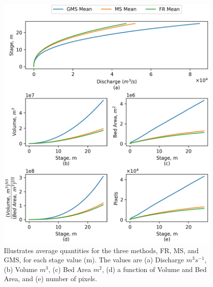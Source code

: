 \documentclass[draft]{dependencies/agujournal2019}
\begin{document}
%
%
\begin{figure}[H]
    \centering
    \includegraphics[scale=1.0]{figures/rating_curve_comparison.jpg}
    \caption{Illustrates average quantities for the three methods, FR, MS, and GMS, for each stage value (m). 
    The values are (a) Discharge $m^3s^{-1}$, (b) Volume $m^3$, (c) Bed Area $m^2$, (d) a function of Volume and Bed Area, and (e) number of pixels.
    }
    \label{fig:rating_curve_comparison}
    \end{figure}
\clearpage %
\end{document}
